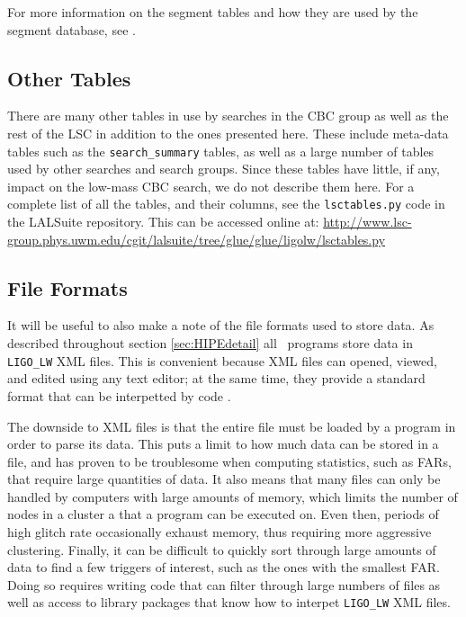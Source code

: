 For more information on the segment tables and how they are used by the segment
database, see \cite{BPP:segdb}.

\subsection{Other Tables}
\label{sec:other_tables}

There are many other tables in use by searches in the \ac{CBC} group as well as
the rest of the \ac{LSC} in addition to the ones presented here. These include
meta-data tables such as the \texttt{search\_summary} tables, as well as a
large number of tables used by other searches and search groups. Since these
tables have little, if any, impact on the low-mass \ac{CBC} search, we do not
describe them here. For a complete list of all the tables, and their columns,
see the \texttt{lsctables.py} code in the LALSuite repository. This can be
accessed online at:
\url{http://www.lsc-group.phys.uwm.edu/cgit/lalsuite/tree/glue/glue/ligolw/lsctables.py}

\subsection{File Formats}

It will be useful to also make a note of the file formats used to store data.
As described throughout section \ref{sec:HIPEdetail} all \hipe~programs store
data in \verb|LIGO_LW| XML files. This is convenient because XML files can
opened, viewed, and edited using any text editor; at the same time, they
provide a standard format that can be interpetted by code
\cite{tech:Williams:2005}.

The downside to XML files is that the entire file must be loaded by a program
in order to parse its data. This puts a limit to how much data can be stored in
a file, and has proven to be troublesome when computing statistics, such as
\acp{FAR}, that require large quantities of data. It also means that many files
can only be handled by computers with large amounts of memory, which limits the
number of nodes in a cluster a that a program can be executed on. Even then,
periods of high glitch rate occasionally exhaust memory, thus requiring more
aggressive clustering. Finally, it can be difficult to quickly sort through
large amounts of data to find a few triggers of interest, such as the ones with
the smallest \ac{FAR}. Doing so requires writing code that can filter through
large numbers of files as well as access to library packages that know how to
interpet \verb|LIGO_LW| XML files.

